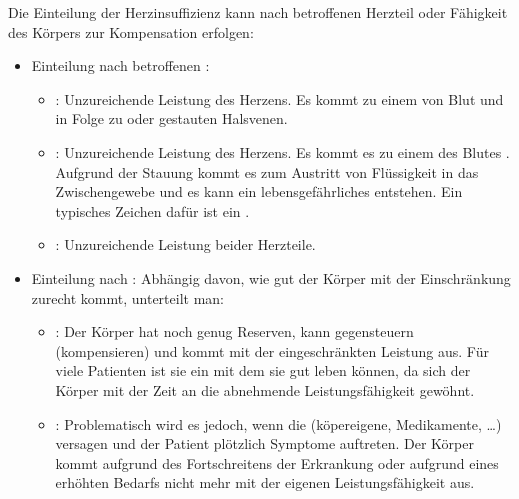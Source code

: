 \documentclass[
ngerman,
paper=a4,
asymmetric,
fontsize=10pt,
draft=false,
numbers=noenddot,
bibtotocnumbered,
footnotes=multiple,
]{scrreprt}
\newcommand{\jNEU}{\vspace{6pt}\noindent{\color{green}\sffamily\textbf{ADDED}\hrulefill\newline}}
\begin{document}
\jNEU
 {Die Einteilung der Herzinsuffizienz kann nach betroffenen
 Herzteil oder Fähigkeit des Körpers zur Kompensation
 erfolgen:
 \begin{itemize}
   \item Einteilung nach betroffenen :
   \begin{itemize}
     \item {}: Unzureichende Leistung des 
    Herzens. Es kommt zu einem  von Blut  und in Folge zu
     oder
    gestauten Halsvenen.
     \item {}:
    Unzureichende Leistung des  Herzens. Es kommt
    es zu einem  des Blutes . Aufgrund der Stauung kommt es zum
    Austritt von Flüssigkeit in das Zwischengewebe und es
    kann ein lebensgefährliches 
    entstehen.
    Ein typisches Zeichen dafür ist ein
    .
     \item {}: Unzureichende Leistung beider Herzteile.
   \end{itemize}
   \item Einteilung nach : Abhängig davon, wie
   gut der Körper mit der
   Einschränkung zurecht kommt, unterteilt man:
   \begin{itemize}
     \item {}: Der Körper hat noch
    genug Reserven, kann gegensteuern (kompensieren) und
    kommt mit der eingeschränkten Leistung aus. Für viele
    Patienten ist sie ein  mit dem sie
    gut leben können, da sich der Körper mit der Zeit an die
    abnehmende Leistungsfähigkeit gewöhnt.
     \item {}:
    Problematisch wird es jedoch, wenn die
     (köpereigene, Medikamente,
    {\dots}) versagen und der Patient plötzlich Symptome
    auftreten.
    Der Körper kommt aufgrund des Fortschreitens der Erkrankung oder aufgrund eines erhöhten Bedarfs nicht mehr
    mit der eigenen Leistungsfähigkeit aus.
   \end{itemize}
 \end{itemize}
 
}
\end{document}
